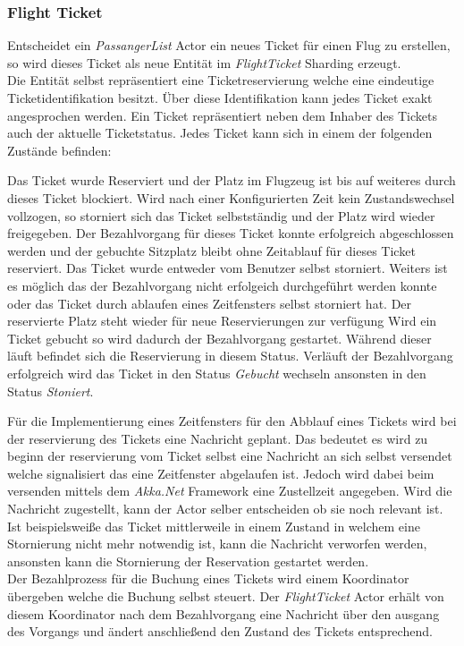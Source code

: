 \subsubsection{Flight Ticket}
Entscheidet ein \textit{PassangerList} Actor ein neues Ticket für einen Flug zu erstellen, so wird dieses Ticket als neue Entität im \textit{FlightTicket} Sharding erzeugt. \\
Die Entität selbst repräsentiert eine Ticketreservierung welche eine eindeutige Ticketidentifikation besitzt. Über diese Identifikation kann jedes Ticket exakt angesprochen werden. Ein Ticket repräsentiert neben dem Inhaber des Tickets auch der aktuelle Ticketstatus. Jedes Ticket kann sich in einem der folgenden Zustände befinden:
\begin{enumerate}
     Das Ticket wurde Reserviert und der Platz im Flugzeug ist bis auf weiteres durch dieses Ticket blockiert. Wird nach einer Konfigurierten Zeit kein Zustandswechsel vollzogen, so storniert sich das Ticket selbstständig und der Platz wird wieder freigegeben.
     Der Bezahlvorgang für dieses Ticket konnte erfolgreich abgeschlossen werden und der gebuchte Sitzplatz bleibt ohne Zeitablauf für dieses Ticket reserviert.
     Das Ticket wurde entweder vom Benutzer selbst storniert. Weiters ist es möglich das der Bezahlvorgang nicht erfolgeich durchgeführt werden konnte oder das Ticket durch ablaufen eines Zeitfensters selbst storniert hat. Der reservierte Platz steht wieder für neue Reservierungen zur verfügung
     Wird ein Ticket gebucht so wird dadurch der Bezahlvorgang gestartet. Während dieser läuft befindet sich die Reservierung in diesem Status. Verläuft der Bezahlvorgang erfolgreich wird das Ticket in den Status \textit{Gebucht} wechseln ansonsten in den Status \textit{Stoniert}.
\end{enumerate}
Für die Implementierung eines Zeitfensters für den Abblauf eines Tickets wird bei der reservierung des Tickets eine Nachricht geplant. Das bedeutet es wird zu beginn der reservierung vom Ticket selbst eine Nachricht an sich selbst versendet welche signalisiert das eine Zeitfenster abgelaufen ist. Jedoch wird dabei beim versenden mittels dem \textit{Akka.Net} Framework eine Zustellzeit angegeben. Wird die Nachricht zugestellt, kann der Actor selber entscheiden ob sie noch relevant ist. Ist beispielsweiße das Ticket mittlerweile in einem Zustand in welchem eine Stornierung nicht mehr notwendig ist, kann die Nachricht verworfen werden, ansonsten kann die Stornierung der Reservation gestartet werden. \\
Der Bezahlprozess für die Buchung eines Tickets wird einem Koordinator übergeben welche die Buchung selbst steuert. Der \textit{FlightTicket} Actor erhält von diesem Koordinator nach dem Bezahlvorgang eine Nachricht über den ausgang des Vorgangs und ändert anschließend den Zustand des Tickets entsprechend. 